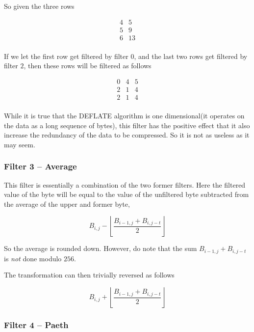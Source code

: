 So given the three rows

\[
 \begin{matrix}
  4 & 5 \\
  5 & 9 \\
  6 & 13 \\
 \end{matrix}
\]

If we let the first row get filtered by filter $0$, and the last two
rows get filtered by filter $2$, then these rows will be filtered as
follows

\[
 \begin{matrix}
  0 & 4 & 5 \\
  2 & 1 & 4 \\
  2 & 1 & 4 \\
 \end{matrix}
\]

While it is true that the DEFLATE algorithm is one dimensional(it
operates on the data as a long sequence of bytes), this filter has the
positive effect that it also increase the redundancy of the data to be
compressed. So it is not as useless as it may seem.

\subsubsection{Filter 3 -- Average}

This filter is essentially a combination of the two former
filters. Here the filtered value of the byte will be equal to the
value of the unfiltered byte subtracted from the average of the upper
and former byte,

\begin{equation*}
  B_{i,j} - \left \lfloor \frac{B_{i-1,j} +
    B_{i,j-t}}{2} \right \rfloor
\end{equation*}

So the average is rounded down. However, do note that the sum $B_{i-1,j} +
    B_{i,j-t}$ is \textit{not} done modulo $256$.

The transformation can then trivially reversed as follows

\begin{equation*}
  B_{i,j} + \left \lfloor \frac{B_{i-1,j} +
    B_{i,j-t}}{2} \right \rfloor
\end{equation*}


\subsubsection{Filter 4 -- Paeth}

